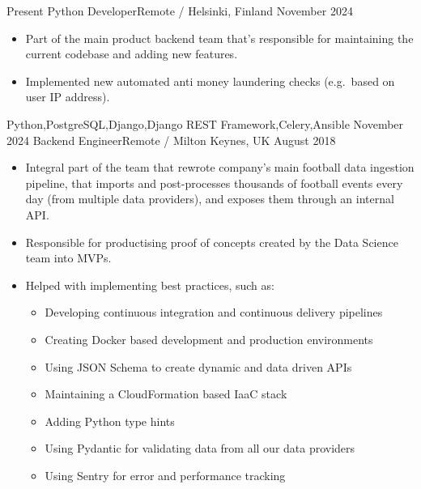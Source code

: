 \documentclass[localFont,alternative,10pt]{yaac-another-awesome-cv}
\begin{document}
  \begin{experiences}
    \experience
      {Present}       {Python Developer}{}{Remote / Helsinki, Finland}
      {November 2024} {
                        \begin{itemize}
                          \item Part of the main product backend team that's responsible for maintaining the current codebase and adding new features.
                          \item Implemented new automated anti money laundering checks (e.g.\ based on user IP address).
                        \end{itemize}
                      }
                      {Python,PostgreSQL,Django,Django REST Framework,Celery,Ansible}
    \emptySeparator
    \experience
      {November 2024} {Backend Engineer}{}{Remote / Milton Keynes, UK}
      {August 2018}   {
                        \begin{itemize}
                          \item Integral part of the team that rewrote company's main football data ingestion pipeline, that imports and post-processes thousands of football events every day (from multiple data providers), and exposes them through an internal API.
                          \item Responsible for productising proof of concepts created by the Data Science team into MVPs.
                          \item Helped with implementing best practices, such as:
                            \begin{itemize}
                              \item Developing continuous integration and continuous delivery pipelines
                              \item Creating Docker based development and production environments
                              \item Using JSON Schema to create dynamic and data driven APIs
                              \item Maintaining a CloudFormation based IaaC stack
                              \item Adding Python type hints
                              \item Using Pydantic for validating data from all our data providers
                              \item Using Sentry for error and performance tracking

\end{itemize}
\end{itemize}}
\end{experiences}
\end{document}
